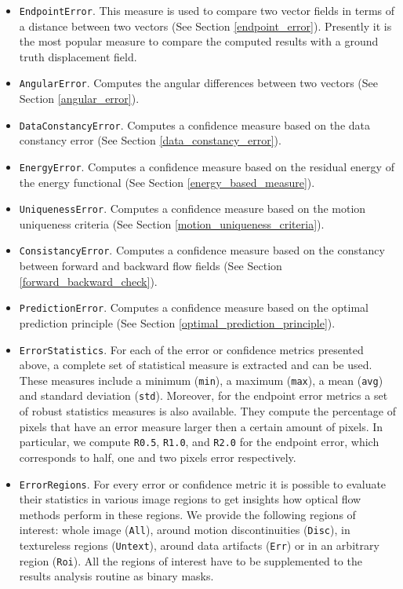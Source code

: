\begin{itemize}
	\item \texttt{EndpointError}. This measure is used to compare two vector fields in terms of a distance between two vectors (See Section \ref{endpoint_error}). Presently it is the most popular measure to compare the computed results with a ground truth displacement field.  
	
	\item \texttt{AngularError}. Computes the angular differences between two vectors (See Section \ref{angular_error}).
	
	\item \texttt{DataConstancyError}. Computes a confidence measure based on the data constancy error (See Section \ref{data_constancy_error}).
	
	\item \texttt{EnergyError}. Computes a confidence measure based on the residual energy of the energy functional (See Section \ref{energy_based_measure}).
	
	\item \texttt{UniquenessError}. Computes a confidence measure based on the motion uniqueness criteria (See Section \ref{motion_uniqueness_criteria}).
	
	\item \texttt{ConsistancyError}. Computes a confidence measure based on the constancy between forward and backward flow fields (See Section \ref{forward_backward_check}).
	
	\item \texttt{PredictionError}. Computes a confidence measure based on the optimal prediction principle (See Section \ref{optimal_prediction_principle}).
	
	\item \texttt{ErrorStatistics}. For each of the error or confidence metrics presented above, a complete set of statistical measure is extracted and can be used. These measures include a minimum (\texttt{min}), a maximum (\texttt{max}), a mean (\texttt{avg}) and standard deviation (\texttt{std}). Moreover, for the endpoint error metrics a set of robust statistics measures is also available. They compute the percentage of pixels that have an error measure larger then a certain amount of pixels. In particular, we compute \texttt{R0.5}, \texttt{R1.0}, and \texttt{R2.0} for the endpoint error, which corresponds to half, one and two pixels error respectively.  
	
	\item \texttt{ErrorRegions}. For every error or confidence metric it is possible to evaluate their statistics in various image regions to get insights how optical flow methods perform in these regions. We provide the following regions of interest: whole image (\texttt{All}), around motion discontinuities (\texttt{Disc}), in textureless regions (\texttt{Untext}), around data artifacts (\texttt{Err}) or in an arbitrary region (\texttt{Roi}). All the regions of interest have to be supplemented to the results analysis routine as binary masks.
	
\end{itemize}

